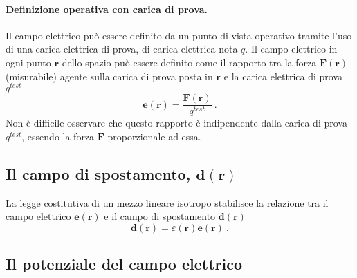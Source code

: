 \paragraph{Definizione operativa con carica di prova.} Il campo elettrico può essere definito da un punto di vista operativo tramite l'uso di una carica elettrica di prova, di carica elettrica nota $q$. Il campo elettrico in ogni punto $\mathbf{r}$ dello spazio può essere definito come il rapporto tra la forza $\textbf{F}(\mathbf{r})$ (misurabile) agente sulla carica di prova posta in $\mathbf{r}$ e la carica elettrica di prova $q^{test}$
\begin{equation}
    \mathbf{e}(\mathbf{r}) = \dfrac{\mathbf{F}(\mathbf{r})}{q^{test}} \ .
\end{equation}
Non è difficile osservare che questo rapporto è indipendente dalla carica di prova $q^{test}$, essendo la forza $\mathbf{F}$ proporzionale ad essa.

\subsection{Il campo di spostamento, $\mathbf{d}(\mathbf{r})$}
La legge costitutiva di un mezzo lineare isotropo stabilisce la relazione tra il campo elettrico $\mathbf{e}(\mathbf{r})$ e il campo di spostamento $\mathbf{d}(\mathbf{r})$
\begin{equation}
    \mathbf{d}(\mathbf{r}) = \varepsilon(\mathbf{r}) \mathbf{e}(\mathbf{r}) \ .
\end{equation}

\subsection{Il potenziale del campo elettrico}



